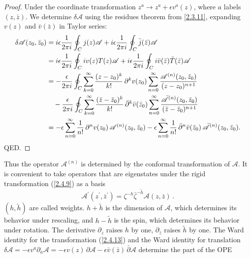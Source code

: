 \begin{tcolorbox}[breakable]
	\begin{proof}
		Under the coordinate transformation $z^a \to z^a + \epsilon v^a(z)$, where $a$ labels $(z,\bar z)$.
		We determine $\delta \mathscr{A}$ using the residues theorem from \eqref{2.3.11}, expanding $v(z)$ and $\bar v(\bar z)$ in Taylor series:
		\begin{align}
			\delta \mathscr{A}(z_0,\bar z_0)
			&= i\epsilon \frac{1}{2\pi i} \oint_C j(z)\mathscr{A}
			+ i\epsilon \frac{1}{2\pi i} \oint_C \bar j(\bar z)\mathscr{A} \notag\\
			&= i\epsilon \frac{1}{2\pi i} \oint_C i v(z) T(z)\mathscr{A}
			+ i\epsilon \frac{1}{2\pi i} \oint_C i \bar v(\bar z)\bar T(\bar z)\mathscr{A} \notag\\
			&= -\frac{\epsilon}{2\pi i} \oint_C 
			\sum_{k=0}^{\infty} \frac{(z-z_0)^k}{k!}\,\partial^k v(z_0)
			\sum_{n=0}^{\infty} \frac{\mathscr{A}^{(n)}(z_0,\bar z_0)}{(z-z_0)^{n+1}} \notag\\
			&\quad -\frac{\epsilon}{2\pi i} \oint_C 
			\sum_{k=0}^{\infty} \frac{(\bar z-\bar z_0)^k}{k!}\,\bar\partial^k \bar v(\bar z_0)
			\sum_{n=0}^{\infty} \frac{\bar{\mathscr{A}}^{(n)}(z_0,\bar z_0)}{(\bar z-\bar z_0)^{n+1}} \notag\\
			&= -\epsilon \sum_{n=0}^{\infty} \frac{1}{n!}\,\partial^n v(z_0)\,\mathscr{A}^{(n)}(z_0,\bar z_0)
			-\epsilon \sum_{n=0}^{\infty} \frac{1}{n!}\,\bar\partial^n \bar v(\bar z_0)\,\bar{\mathscr{A}}^{(n)}(z_0,\bar z_0).
		\end{align}
		QED.
	\end{proof}
\end{tcolorbox}
Thus the operator $\mathscr{A}^{(n)}$ is determined by the conformal transformation of $\mathscr{A}$.    
It is convenient to take operators that are eigenstates under the rigid transformation (\ref{2.4.9}) as a basis    
\begin{equation}\label{2.4.13}
	\mathscr{A}^{\prime}(z^{\prime}, \bar{z}^{\prime})=\zeta^{-h} \bar{\zeta}^{-\tilde{h}} \mathscr{A}(z, \bar{z}) \:.
\end{equation}
$(h, \tilde{h})$ are called weights. $h+ \tilde{h}$ is the dimension of $\mathscr{A}$, which determines its behavior under rescaling, and $h- \tilde{h}$ is the spin, which determines its behavior under rotation.    
The derivative $\partial_z$ raises $h$ by one, $\partial_{\bar{z}}$ raises $\tilde{h}$ by one. The Ward identity for the transformation (\ref{2.4.13}) and the Ward identity for translation $\delta \mathscr{A}=-\epsilon v^{a} \partial_{a} \mathscr{A}= -\epsilon v(z)\,\partial \mathscr{A} - \epsilon\bar v(\bar z)\,\bar\partial \mathscr{A}$ determine the part of the OPE    
